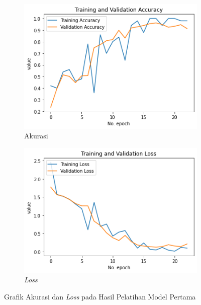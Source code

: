 \begin{figure}[H]
  \centering
  \begin{subfigure}[b]{0.55\textwidth}
      \includegraphics[width=\textwidth]{gambar/bab4/modelpertama/train.png}
      \caption{Akurasi}
  \end{subfigure}

  \begin{subfigure}[b]{0.55\textwidth}
      \includegraphics[width=\textwidth]{gambar/bab4/modelpertama/loss.png}
      \caption{\emph{Loss}}
  \end{subfigure}
  \caption{Grafik Akurasi dan \emph{Loss} pada Hasil Pelatihan Model Pertama}
  \label{fig:acc_loss1}
\end{figure}

